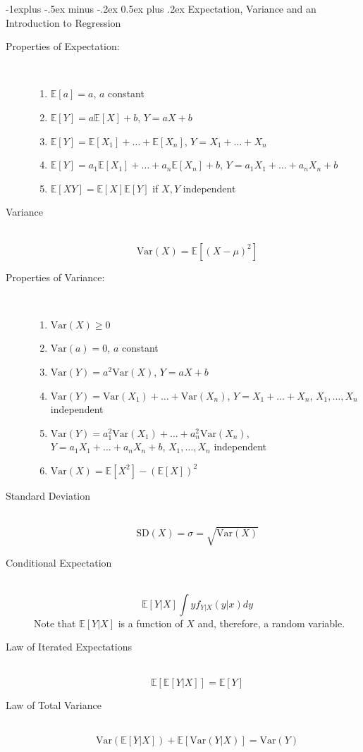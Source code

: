 \documentclass[a4paper,10pt,landscape]{article}
\makeatletter
\newcommand{\var}{\textrm{Var}}
\renewcommand{\subsection}{\@startsection{subsection}{2}{0mm}%
                                {-1explus -.5ex minus -.2ex}%
                                {0.5ex plus .2ex}%
                                {\normalfont\normalsize\bfseries}}
\makeatother
\begin{document}
\begin{multicols*}{3}
\subsection{Expectation, Variance and an Introduction to \newline Regression}
\begin{description}
	\item[Properties of Expectation:] ~
	\begin{enumerate}
		\item $\mathbb{E}\left[a\right]=a$, $a$ constant
		\item $\mathbb{E}\left[Y\right]=a\mathbb{E}\left[X\right]+b$, $Y=aX+b$
		\item $\mathbb{E}\left[Y\right]=\mathbb{E}[X_1]+\dots+\mathbb{E}[X_n]$, $Y=X_1+\dots+X_n$
		\item $\mathbb{E}[Y]=a_1\mathbb{E}[X_1]+\dots+a_n\mathbb{E}[X_n]+b$, $Y=a_1X_1+\dots+a_nX_n+b$
		\item $\mathbb{E}[XY]=\mathbb{E}[X]\mathbb{E}[Y]$ if $X,Y$ independent
	\end{enumerate}
	\item[Variance] ~
	$$\var(X)=\mathbb{E}\left[\left(X-\mu\right)^2\right]$$
	\item[Properties of Variance:] ~
	\begin{enumerate}
		\item $\var(X)\geq0$
		\item $\var(a)=0$, $a$ constant
		\item $\var(Y)=a^2\var(X)$, $Y=aX+b$
		\item $\var(Y)=\var(X_1)+\dots+\var(X_n)$, $Y=X_1+\dots+X_n$, $X_1,\dots,X_n$ independent
		\item $\var(Y)=a_1^2\var(X_1)+\dots+a_n^2\var(X_n)$, $Y=a_1X_1+\dots+a_nX_n+b$, $X_1,\dots,X_n$ independent
		\item $\var(X)=\mathbb{E}[X^2]-\left(\mathbb{E}[X]\right)^2$
	\end{enumerate}
	\item[Standard Deviation] ~
	$$\text{SD}(X)=\sigma=\sqrt{\var(X)}$$
	\item[Conditional Expectation] ~
	$$\mathbb{E}\left[Y|X\right]\int yf_{Y|X}(y|x)dy$$
	Note that $\mathbb{E}\left[Y|X\right]$ is a function of $X$ and, therefore, a random variable.
	\item[Law of Iterated Expectations] ~
	$$\mathbb{E}\left[\mathbb{E}\left[Y|X\right]\right]=\mathbb{E}[Y]$$
	\item[Law of Total Variance] ~
	$$\var\left(\mathbb{E}\left[Y|X\right]\right)+\mathbb{E}\left[\var\left(Y|X\right)\right]=\var(Y)$$
\end{description}


\end{multicols*}
\end{document}

